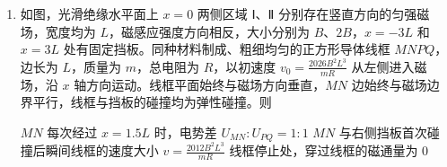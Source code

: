 \documentclass[\gkver]{gaokaozhenti}
\begin{document}
\begin{enumerate}
{B．根据 $v=\omega r$ 结合 A 选项分析可知卫星线速度大于地球的线速度，故 B 错误；

C．根据题意可知太阳和地球对卫星引力的合力提供卫星做圆周运动的向心力，向心力一定指向圆心，即向心力一定指向 $P$ 点，故 C 错误；

D．根据题意可知太阳和卫星的距离等于地球和卫星的距离，根据万有引力的表达式 $F=G\frac{Mm}{r^{2}}$ 可知太阳和地球对卫星的引力大小之比等于太阳和地球的质量之比，故 D 正确。

故选 AD。
}
\item
如图，光滑绝缘水平面上 $x=0$ 两侧区域 Ⅰ、Ⅱ 分别存在竖直方向的匀强磁场，宽度均为 $L$，磁感应强度方向相反，大小分别为 $B$、$2B$，$x=-3L$ 和 $x=3L$ 处有固定挡板。同种材料制成、粗细均匀的正方形导体线框 $MNPQ$，边长为 $L$，质量为 $m$，总电阻为 $R$，以初速度 $v_{0}=\frac{2026B^{2}L^{3}}{mR}$ 从左侧进入磁场，沿 $x$ 轴方向运动。线框平面始终与磁场方向垂直，$MN$ 边始终与磁场边界平行，线框与挡板的碰撞均为弹性碰撞。则 
\onepicture[w=13cm]{}

{$MN$ 每次经过 $x=1.5L$ 时，电势差 $U_{MN}:U_{PQ}=1:1$}
{$MN$ 与右侧挡板首次碰撞后瞬间线框的速度大小 $v=\frac{2012B^{2}L^{3}}{mR}$}
{线框停止处，穿过线框的磁通量为 0}

\end{enumerate}
\end{document}
